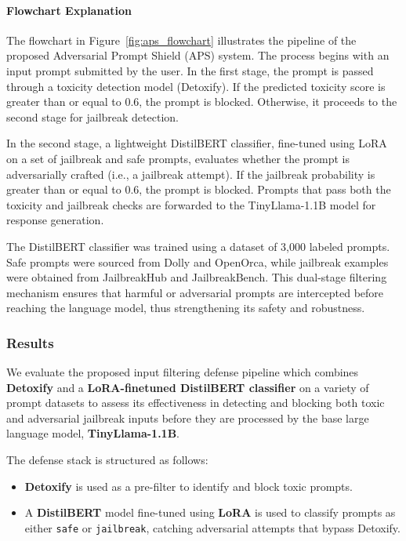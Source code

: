 \documentclass[../main.tex]{subfiles}
\begin{document}
\paragraph{Flowchart Explanation}
The flowchart in Figure~\ref{fig:aps_flowchart} illustrates the pipeline of the proposed Adversarial Prompt Shield (APS) system. The process begins with an input prompt submitted by the user. In the first stage, the prompt is passed through a toxicity detection model (Detoxify). If the predicted toxicity score is greater than or equal to 0.6, the prompt is blocked. Otherwise, it proceeds to the second stage for jailbreak detection.

In the second stage, a lightweight DistilBERT classifier, fine-tuned using LoRA on a set of jailbreak and safe prompts, evaluates whether the prompt is adversarially crafted (i.e., a jailbreak attempt). If the jailbreak probability is greater than or equal to 0.6, the prompt is blocked. Prompts that pass both the toxicity and jailbreak checks are forwarded to the TinyLlama-1.1B model for response generation.

The DistilBERT classifier was trained using a dataset of 3,000 labeled prompts. Safe prompts were sourced from Dolly and OpenOrca, while jailbreak examples were obtained from JailbreakHub and JailbreakBench. This dual-stage filtering mechanism ensures that harmful or adversarial prompts are intercepted before reaching the language model, thus strengthening its safety and robustness.


\subsubsection{Results}


We evaluate the proposed input filtering defense pipeline which combines \textbf{Detoxify} and a \textbf{LoRA-finetuned DistilBERT classifier} on a variety of prompt datasets to assess its effectiveness in detecting and blocking both toxic and adversarial jailbreak inputs before they are processed by the base large language model, \textbf{TinyLlama-1.1B}.

The defense stack is structured as follows:
\begin{itemize}
    \item \textbf{Detoxify} is used as a pre-filter to identify and block toxic prompts.
    \item A \textbf{DistilBERT} model fine-tuned using \textbf{LoRA} is used to classify prompts as either \texttt{safe} or \texttt{jailbreak}, catching adversarial attempts that bypass Detoxify.
\end{itemize}
\end{document}
